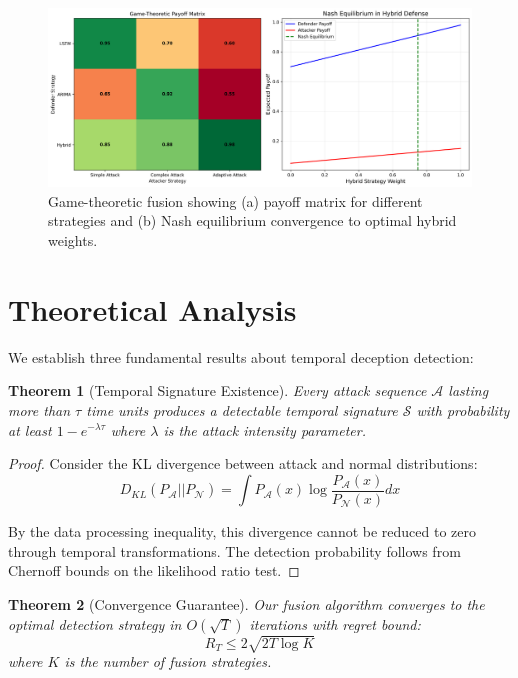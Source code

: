 \documentclass[10pt,conference]{IEEEtran}
\newtheorem{theorem}{Theorem}
\begin{document}
\begin{figure}[!t]
\centering
\includegraphics[width=\columnwidth]{figures/game_theory_fusion.png}
\caption{Game-theoretic fusion showing (a) payoff matrix for different strategies and (b) Nash equilibrium convergence to optimal hybrid weights.}
\label{fig:gametheory}
\end{figure}

\section{Theoretical Analysis}

We establish three fundamental results about temporal deception detection:

\begin{theorem}[Temporal Signature Existence]
Every attack sequence $\mathcal{A}$ lasting more than $\tau$ time units produces a detectable temporal signature $\mathcal{S}$ with probability at least $1 - e^{-\lambda\tau}$ where $\lambda$ is the attack intensity parameter.
\end{theorem}

\begin{proof}
Consider the KL divergence between attack and normal distributions:
\begin{equation}
D_{KL}(P_{\mathcal{A}} || P_{\mathcal{N}}) = \int P_{\mathcal{A}}(x) \log \frac{P_{\mathcal{A}}(x)}{P_{\mathcal{N}}(x)} dx
\end{equation}

By the data processing inequality, this divergence cannot be reduced to zero through temporal transformations. The detection probability follows from Chernoff bounds on the likelihood ratio test.
\end{proof}

\begin{theorem}[Convergence Guarantee]
Our fusion algorithm converges to the optimal detection strategy in $O(\sqrt{T})$ iterations with regret bound:
\begin{equation}
R_T \leq 2\sqrt{2T \log K}
\end{equation}
where $K$ is the number of fusion strategies.
\end{theorem}
\end{document}
